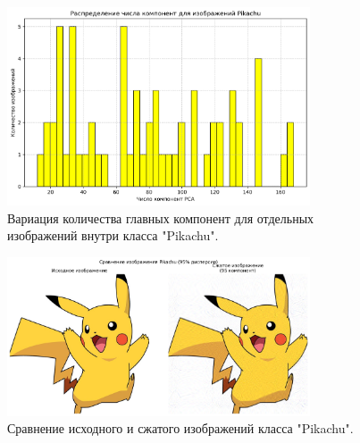 \documentclass[14pt]{extarticle}
\begin{document}
\begin{figure}[H] %
\centering
\includegraphics[width=0.8\textwidth]{components_by_image.png}
\caption{Вариация количества главных компонент для отдельных изображений внутри класса "Pikachu".}
\label{fig:components_image}
\end{figure}

\begin{figure}[H] %
\centering
\includegraphics[width=0.8\textwidth]{pikachu_comparison.png}
\caption{Сравнение исходного и сжатого изображений класса "Pikachu".}
\label{fig:pikachu_comparison}
\end{figure}
\end{document}
